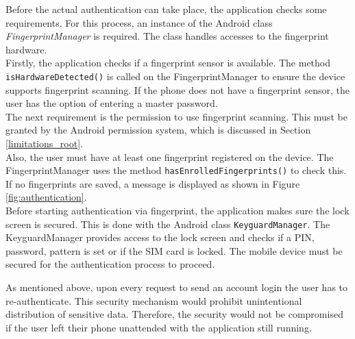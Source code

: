 Before the actual authentication can take place, the application checks some requirements. For this process, an instance of the Android class \textit{FingerprintManager} is required. The class handles accesses to the fingerprint hardware. \cite{FingerprintManager} \\
Firstly, the application checks if a fingerprint sensor is available. The method \texttt{isHardwareDetected()} is called on the FingerprintManager to ensure the device supports fingerprint scanning.  If the phone does not have a fingerprint sensor, the user has the option of entering a master password. \\
The next requirement is the permission to use fingerprint scanning. This must be granted by the Android permission system, which is discussed in Section \ref{limitations_root}. \\
Also, the user must have at least one fingerprint registered on the device. \cite{Techotopia} The FingerprintManager uses the method \texttt{hasEnrolledFingerprints()} to check this. If no fingerprints are saved, a message is displayed as shown in Figure \ref{fig:authentication}\protect{}. \\
Before starting authentication via fingerprint, the application makes sure the lock screen is secured. This is done with the Android class \texttt{KeyguardManager}. \cite{KeyguardManager} The KeyguardManager provides access to the lock screen and checks if a PIN, password, pattern is set or if the SIM card is locked. The mobile device must be secured for the authentication process to proceed.

As mentioned above, upon every request to send an account login the user has to re-authenticate. This security mechanism would prohibit unintentional distribution of sensitive data. Therefore, the security would not be compromised if the user left their phone unattended with the application still running. \\

